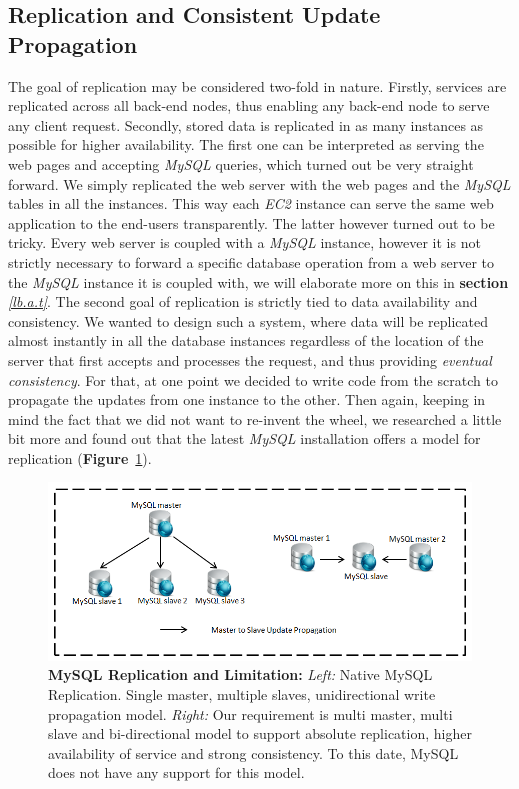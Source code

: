 \documentclass[12pt]{article}
\begin{document}
\subsection{Replication and Consistent Update Propagation} 
The goal of replication may be considered two-fold in nature. Firstly, services are
replicated across all back-end nodes, thus enabling any back-end node to serve
any client request. Secondly, stored data is replicated in as many instances as
possible for higher availability. The first one can be interpreted as serving the web pages and accepting \emph{MySQL} queries, which turned out be very straight forward. We simply replicated the web server with
the web pages and the \emph{MySQL} tables in all the instances. This way each
\emph{EC2} instance can serve the same web application to the end-users
transparently. The latter however turned out to be tricky. Every web server is
coupled with a \emph{MySQL} instance, however it is not strictly necessary to
forward a specific database operation from a web server to the \emph{MySQL}
instance it is coupled with, we will elaborate more on this in \textbf{section}
\emph{\ref{lb.a.t}}. The second goal of replication is strictly tied to data
availability and consistency. We wanted to design such a system, where data will
be replicated almost instantly in all the database instances regardless of the
location of the server that first accepts and processes the request, and thus
providing \emph{eventual consistency}. For that, at one point we decided to write code
from the scratch to propagate the updates from one instance to the other. Then
again, keeping in mind the fact that we did not want to re-invent the wheel, we
researched a little bit more and found out that the latest \emph{MySQL}
installation offers a model for replication \cite{mysql-replication}(\textbf{Figure}~\ref{fig:mysqlreplication}).  
\begin{figure}[H] 
\centering
\includegraphics[scale=0.80]{Images/figure6.PNG} 
\caption{\textbf{MySQL Replication and Limitation:} 
\emph{Left: }Native MySQL Replication. Single master, multiple slaves, unidirectional 
write propagation model.  
\emph{Right:}
Our requirement is multi master, multi slave and bi-directional model to support
absolute replication, higher availability of service and strong consistency. To
this date, MySQL does not have any support for this model.}
\label{fig:mysqlreplication} 
\end{figure} 
\end{document}
